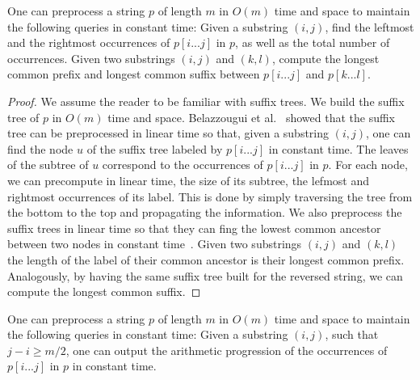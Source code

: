 \begin{proposition}
\label{prop:suffix_tree}
One can preprocess a string $p$ of length $m$ in $O(m)$ time and space to maintain the following queries in constant time: Given a substring $(i,j)$, find the leftmost and the rightmost occurrences of $p[i...j]$ in $p$, as well as the total number of occurrences. Given two substrings $(i,j)$ and $(k,l)$, compute the longest common prefix and longest common suffix between $p[i...j]$ and $p[k...l]$.
\end{proposition}
\begin{proof}
We assume the reader to be familiar with suffix trees. We build the suffix tree of $p$ in $O(m)$ time and space. Belazzougui et al.~\cite{belazzougui_et_al:LIPIcs.CPM.2021.8} showed that the suffix tree can be preprocessed in linear time so that, given a substring $(i,j)$, one can find the node $u$ of the suffix tree labeled by $p[i...j]$ in constant time. The leaves of the subtree of $u$ correspond to the occurrences of $p[i...j]$ in $p$.
For each node, we can precompute in linear time, the size of its subtree, the lefmost and rightmost occurrences of its label. This is done by simply traversing the tree from the bottom to the top and propagating the information.
We also preprocess the suffix trees in linear time so that they can fing the lowest common ancestor between two nodes in constant time~\cite{bender2000lca}. Given two substrings $(i,j)$ and $(k,l)$ the length of the label of their common ancestor is their longest common prefix. Analogously, by having the same suffix tree built for the reversed string, we can compute the longest common suffix.
\end{proof}

\begin{corollary}
\label{cor:imp}
One can preprocess a string $p$ of length $m$ in $O(m)$ time and space to maintain the following queries in constant time: Given a substring $(i,j)$, such that $j-i\ge m/2$, one can output the arithmetic progression of the occurrences of $p[i...j]$ in $p$ in constant time.
\end{corollary}



